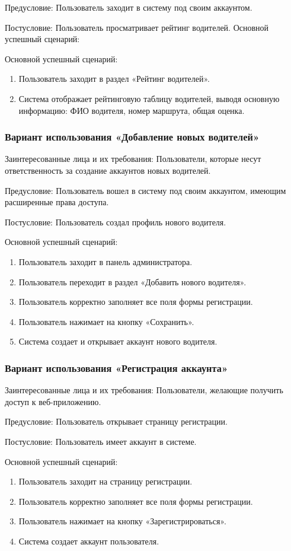 Предусловие: Пользователь заходит в систему под своим аккаунтом.

Постусловие: Пользователь просматривает рейтинг водителей.
Основной успешный сценарий: 

Основной успешный сценарий: 
\begin{enumerate}
	\item Пользователь заходит в раздел «Рейтинг водителей».
	\item Система отображает рейтинговую таблицу водителей, выводя основную информацию: ФИО водителя, номер маршрута, общая оценка. 
\end{enumerate}

\subsubsection {Вариант использования «Добавление новых водителей»}
Заинтересованные лица и их требования: Пользователи, которые несут ответственность за создание аккаунтов новых водителей.

Предусловие: Пользователь вошел в систему под своим аккаунтом, имеющим расширенные права доступа. 

Постусловие: Пользователь создал профиль нового водителя.

Основной успешный сценарий: 
\begin{enumerate}
	\item Пользователь заходит в панель администратора.
	\item Пользователь переходит в раздел «Добавить нового водителя».
	\item Пользователь корректно заполняет все поля формы регистрации. 
	\item Пользователь нажимает на кнопку «Сохранить».
	\item Система создает и открывает аккаунт нового водителя.
\end{enumerate}

\subsubsection {Вариант использования «Регистрация аккаунта»}
Заинтересованные лица и их требования: Пользователи, желающие получить доступ к веб-приложению.

Предусловие: Пользователь открывает страницу регистрации.

Постусловие: Пользователь имеет аккаунт в системе.

Основной успешный сценарий: 
\begin{enumerate}
	\item Пользователь заходит на страницу регистрации.
	\item Пользователь корректно заполняет все поля формы регистрации.
	\item Пользователь нажимает на кнопку «Зарегистрироваться».
	\item Система создает аккаунт пользователя.
\end{enumerate}

